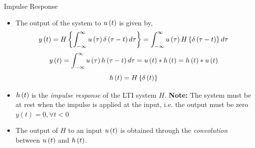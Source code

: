 \documentclass[aspectratio=169]{beamer}
\def\lp{\ensuremath\left(}
\def\rp{\ensuremath\right)}
\def\lc{\ensuremath\left\{}
\def\rc{\ensuremath\right\}}
\begin{document}
\begin{frame}{Impulse Response}
\begin{center}
\end{center}
\begin{itemize}    

    \item The output of the system to $u\lp t\rp$ is given by,
    \[ y\lp t\rp = H\lc \int_{-\infty}^{\infty} u\lp \tau \rp \delta\lp \tau - t\rp d\tau \rc = \int_{-\infty}^{\infty} u\lp \tau \rp H\lc \delta\lp \tau - t\rp  \rc d\tau \]
    \[ y\lp t\rp = \int_{-\infty}^{\infty} u\lp \tau \rp h\lp \tau - t\rp d\tau = u\lp t\rp * h\lp t\rp = h\lp t\rp * u\lp t\rp \]
    \[ h\lp t\rp = H\lc \delta\lp t\rp \rc \]

    \item $h\lp t\rp$ is the \textit{impulse response} of the LTI system $H$. \textbf{Note:} The system must be at rest when the impulse is applied at the input, i.e. the output must be zero $y(t) = 0, \forall t < 0$
    \item The output of $H$ to an input $u\lp t\rp$ is obtained through the \textit{convolution} between $u\lp t\rp$ and $h\lp t\rp$.
\end{itemize}
\end{frame}
\end{document}

